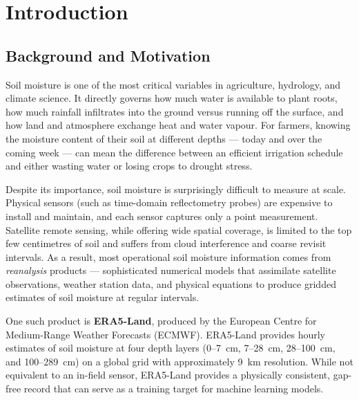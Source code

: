 \documentclass[12pt, a4paper]{article}
\begin{document}
\newpage
\tableofcontents
\newpage


\section{Introduction}

\subsection{Background and Motivation}

Soil moisture is one of the most critical variables in agriculture, hydrology, and climate science. It directly governs how much water is available to plant roots, how much rainfall infiltrates into the ground versus running off the surface, and how land and atmosphere exchange heat and water vapour. For farmers, knowing the moisture content of their soil at different depths --- today and over the coming week --- can mean the difference between an efficient irrigation schedule and either wasting water or losing crops to drought stress.

Despite its importance, soil moisture is surprisingly difficult to measure at scale. Physical sensors (such as time-domain reflectometry probes) are expensive to install and maintain, and each sensor captures only a point measurement. Satellite remote sensing, while offering wide spatial coverage, is limited to the top few centimetres of soil and suffers from cloud interference and coarse revisit intervals. As a result, most operational soil moisture information comes from \textit{reanalysis} products --- sophisticated numerical models that assimilate satellite observations, weather station data, and physical equations to produce gridded estimates of soil moisture at regular intervals.

One such product is \textbf{ERA5-Land}, produced by the European Centre for Medium-Range Weather Forecasts (ECMWF). ERA5-Land provides hourly estimates of soil moisture at four depth layers (0--7~cm, 7--28~cm, 28--100~cm, and 100--289~cm) on a global grid with approximately 9~km resolution. While not equivalent to an in-field sensor, ERA5-Land provides a physically consistent, gap-free record that can serve as a training target for machine learning models.
\end{document}
